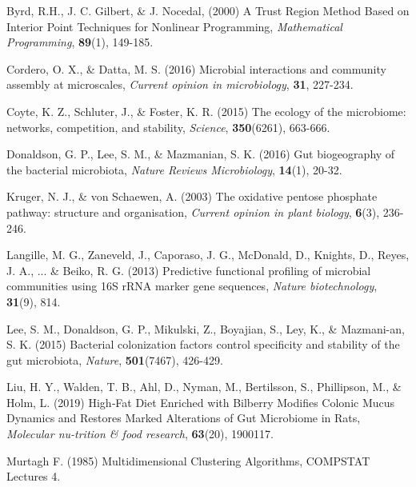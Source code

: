 \documentclass{bioinfo}
\begin{document}
\begin{thebibliography}{}

Byrd, R.H., J. C. Gilbert, \& J. Nocedal, (2000) A Trust Region Method Based on Interior Point Techniques for Nonlinear Programming, {\it Mathematical Programming}, {\bf 89}(1), 149-185.

Cordero, O. X., \& Datta, M. S. (2016) Microbial interactions and community assembly at microscales, {\it Current opinion in microbiology}, {\bf 31}, 227-234.

Coyte, K. Z., Schluter, J., \& Foster, K. R. (2015) The ecology of the microbiome: networks, competition, and stability, {\it Science}, {\bf 350}(6261), 663-666.

Donaldson, G. P., Lee, S. M., \& Mazmanian, S. K. (2016) Gut biogeography of the bacterial microbiota, \textit{Nature Reviews Microbiology}, \textbf{14}(1), 20-32.

Kruger, N. J., \& von Schaewen, A. (2003) The oxidative pentose phosphate pathway: structure and organisation, {\it Current opinion in plant biology}, {\bf 6}(3), 236-246.

Langille, M. G., Zaneveld, J., Caporaso, J. G., McDonald, D., Knights, D., Reyes, J. A., ... \& Beiko, R. G. (2013) Predictive functional profiling of microbial communities using 16S rRNA marker gene sequences, {\it Nature biotechnology}, {\bf 31}(9), 814.

Lee, S. M., Donaldson, G. P., Mikulski, Z., Boyajian, S., Ley, K., \& Mazmani-an, S. K. (2015) Bacterial colonization factors control specificity and stability of the gut microbiota, {\it Nature}, {\bf 501}(7467), 426-429.

Liu, H. Y., Walden, T. B., Ahl, D., Nyman, M., Bertilsson, S., Phillipson, M., \& Holm, L. (2019) High‐Fat Diet Enriched with Bilberry Modifies Colonic Mucus Dynamics and Restores Marked Alterations of Gut Microbiome in Rats, {\it Molecular nu-trition \& food research}, {\bf 63}(20), 1900117.

Murtagh F. (1985) Multidimensional Clustering Algorithms, COMPSTAT Lectures 4.



\end{thebibliography}
\end{document}
